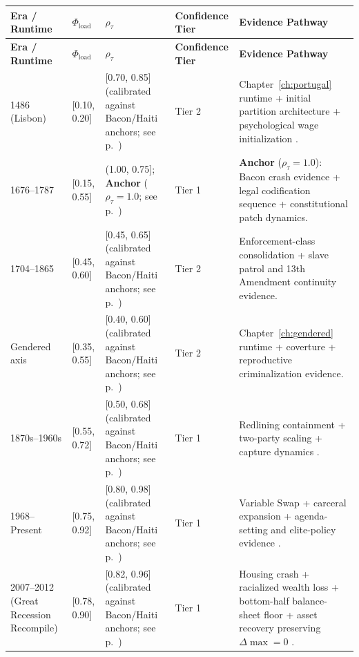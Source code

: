 \begin{longtable}{>{\raggedright}p{3.4cm} >{\raggedright}p{2.3cm} >{\raggedright}p{2.1cm} >{\raggedright}p{2.4cm} >{\raggedright\arraybackslash}p{4.9cm}}
\toprule
\textbf{Era / Runtime} & \textbf{$\Phi_{\text{load}}$} & \textbf{$\rho_{\tau}$} & \textbf{Confidence Tier} & \textbf{Evidence Pathway} \\
\midrule
\endfirsthead
\toprule
\textbf{Era / Runtime} & \textbf{$\Phi_{\text{load}}$} & \textbf{$\rho_{\tau}$} & \textbf{Confidence Tier} & \textbf{Evidence Pathway} \\
\midrule
\endhead
1486 (Lisbon) & [0.10, 0.20] & [0.70, 0.85] (calibrated against Bacon/Haiti anchors; see p.~\pageref{ch:empirical_methodology}) & Tier 2 & Chapter~\ref{ch:portugal} runtime + initial partition architecture + psychological wage initialization \cite{dubois}. \\
1676--1787 & [0.15, 0.55] & (1.00, 0.75]; \textbf{Anchor} ($\rho_\tau = 1.0$; see p.~\pageref{ch:empirical_methodology}) & Tier 1 & \textbf{Anchor} ($\rho_\tau = 1.0$): Bacon crash evidence + legal codification sequence + constitutional patch dynamics. \\
1704--1865 & [0.45, 0.60] & [0.45, 0.65] (calibrated against Bacon/Haiti anchors; see p.~\pageref{ch:empirical_methodology}) & Tier 2 & Enforcement-class consolidation + slave patrol and 13th Amendment continuity evidence. \\
Gendered axis & [0.35, 0.55] & [0.40, 0.60] (calibrated against Bacon/Haiti anchors; see p.~\pageref{ch:empirical_methodology}) & Tier 2 & Chapter~\ref{ch:gendered} runtime + coverture + reproductive criminalization evidence. \\
1870s--1960s & [0.55, 0.72] & [0.50, 0.68] (calibrated against Bacon/Haiti anchors; see p.~\pageref{ch:empirical_methodology}) & Tier 1 & Redlining containment + two-party scaling + capture dynamics \cite{rothstein, coatesreparations}. \\
1968--Present & [0.75, 0.92] & [0.80, 0.98] (calibrated against Bacon/Haiti anchors; see p.~\pageref{ch:empirical_methodology}) & Tier 1 & Variable Swap + carceral expansion + agenda-setting and elite-policy evidence \cite{gilens}. \\
2007--2012 (Great Recession Recompile) & [0.78, 0.90] & [0.82, 0.96] (calibrated against Bacon/Haiti anchors; see p.~\pageref{ch:empirical_methodology}) & Tier 1 & Housing crash + racialized wealth loss + bottom-half balance-sheet floor + asset recovery preserving $\Delta\max=0$ \cite{fed_dfa_2026,cbo_family_wealth_2024,pew_wealth_after_great_recession_2017,pfeffer_danziger_schoeni_2013}. \\

\end{longtable}
